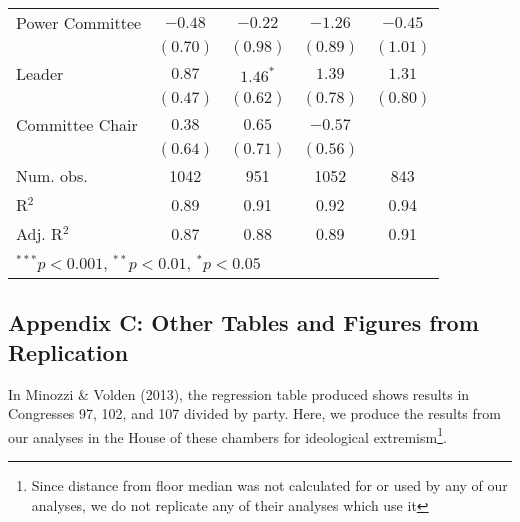 \documentclass[12pt]{article}
\begin{document}
\begin{table}[H]
\begin{center}
\begin{tabular}{l c c c c }
			Power Committee        & $-0.48$      & $-0.22$       & $-1.26$       & $-0.45$      \\
			& $(0.70)$     & $(0.98)$      & $(0.89)$      & $(1.01)$     \\
			Leader                  & $0.87$       & $1.46^{*}$    & $1.39$        & $1.31$       \\
			& $(0.47)$     & $(0.62)$      & $(0.78)$      & $(0.80)$     \\
			Committee Chair                   & $0.38$       & $0.65$        & $-0.57$       &              \\
			& $(0.64)$     & $(0.71)$      & $(0.56)$      &              \\
			\hline
			Num. obs.               & 1042         & 951           & 1052          & 843          \\
			R$^2$      & 0.89         & 0.91          & 0.92          & 0.94         \\
			Adj. R$^2$ & 0.87         & 0.88          & 0.89          & 0.91         \\
			\hline
			\multicolumn{5}{l}{\scriptsize{$^{***}p<0.001$, $^{**}p<0.01$, $^*p<0.05$}}
		\end{tabular}
	\end{center}
\end{table}

\subsection{Appendix C: Other Tables and Figures from Replication}

In Minozzi \& Volden (2013), the regression table produced shows results in Congresses 97, 102, and 107 divided by party. Here, we produce the results from our analyses in the House of these chambers for ideological extremism\footnote{Since distance from floor median was not calculated for or used by any of our analyses, we do not replicate any of their analyses which use it}.
\end{document}
